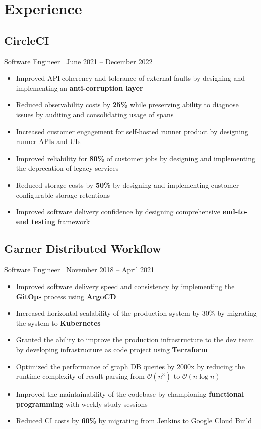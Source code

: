 \documentclass[letterpaper,12pt,oneside]{article}
\begin{document}
\section*{Experience}
\subsection*{CircleCI}
Software Engineer | June 2021 -- December 2022 
\begin{itemize}
    \setlength\itemsep{0em}
    \item Improved API coherency and tolerance of external faults by designing and implementing an \textbf{anti-corruption layer}
    \item Reduced observability costs by \textbf{25\%} while preserving ability to diagnose issues by auditing and consolidating usage of spans
    \item Increased customer engagement for self-hosted runner product by designing runner APIs and UIs
    \item Improved reliability for \textbf{80\%} of customer jobs by designing and implementing the deprecation of legacy services
    \item Reduced storage costs by \textbf{50\%} by designing and implementing customer configurable storage retentions
    \item Improved software delivery confidence by designing comprehensive \textbf{end-to-end testing} framework
\end{itemize}

\subsection*{Garner Distributed Workflow}
Software Engineer | November 2018 -- April 2021
\begin{itemize}
      \setlength\itemsep{0em}
      \item Improved software delivery speed and consistency by implementing the \textbf{GitOps} process using \textbf{ArgoCD}
      \item Increased horizontal scalability of the production system by 30\% by migrating the system to \textbf{Kubernetes}
      \item Granted the ability to improve the production infrastructure to the dev team by developing infrastructure as code project using \textbf{Terraform}
      \item Optimized the performance of graph DB queries by 2000x by reducing the runtime complexity of result parsing from $\mathcal{O}(n^3)$ to $\mathcal{O}(n\log{}n)$
      \item Improved the maintainability of the codebase by championing \textbf{functional programming} with weekly study sessions
      \item Reduced CI costs by \textbf{60\%} by migrating from Jenkins to Google Cloud Build
\end{itemize}
\end{document}
